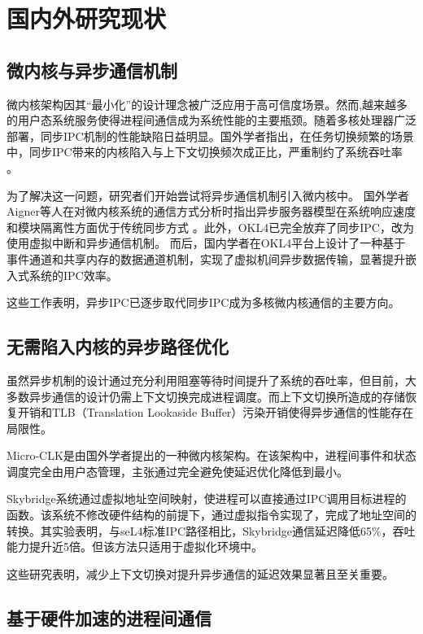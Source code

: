 \section{国内外研究现状}

\subsection{微内核与异步通信机制}

微内核架构因其“最小化”的设计理念被广泛应用于高可信度场景\cite{liedtke}。然而,越来越多的用户态系统服务使得进程间通信成为系统性能的主要瓶颈。随着多核处理器广泛部署，同步IPC机制的性能缺陷日益明显。国外学者指出，在任务切换频繁的场景中，同步IPC带来的内核陷入与上下文切换频次成正比，严重制约了系统吞吐率 \cite{reichmann2015ipcperformance}。

为了解决这一问题，研究者们开始尝试将异步通信机制引入微内核中。
国外学者Aigner等人在对微内核系统的通信方式分析时指出异步服务器模型在系统响应速度和模块隔离性方面优于传统同步方式 \cite{2011Communication}。此外，OKL4已完全放弃了同步IPC，改为使用虚拟中断和异步通信机制\cite{varanasi2010okl4}。
而后，国内学者在OKL4平台上设计了一种基于事件通道和共享内存的数据通道机制，实现了虚拟机间异步数据传输，显著提升嵌入式系统的IPC效率\cite{wang2017efficient}。

这些工作表明，异步IPC已逐步取代同步IPC成为多核微内核通信的主要方向。

\subsection{无需陷入内核的异步路径优化}

虽然异步机制的设计通过充分利用阻塞等待时间提升了系统的吞吐率，但目前，大多数异步通信的设计仍需上下文切换完成进程调度。而上下文切换所造成的存储恢复开销和TLB（Translation Lookaside Buffer）污染开销使得异步通信的性能存在局限性。

Micro-CLK是由国外学者提出的一种微内核架构。在该架构中，进程间事件和状态调度完全由用户态管理，主张通过完全避免使延迟优化降低到最小\cite{Klimiankou2021microclk}。

Skybridge系统\cite{2019SkyBridge}通过虚拟地址空间映射，使进程可以直接通过IPC调用目标进程的函数。该系统不修改硬件结构的前提下，通过虚拟指令实现了，完成了地址空间的转换。其实验表明，与seL4标准IPC路径相比，Skybridge通信延迟降低65\%，吞吐能力提升近5倍。但该方法只适用于虚拟化环境中。

这些研究表明，减少上下文切换对提升异步通信的延迟效果显著且至关重要。

\subsection{基于硬件加速的进程间通信}

